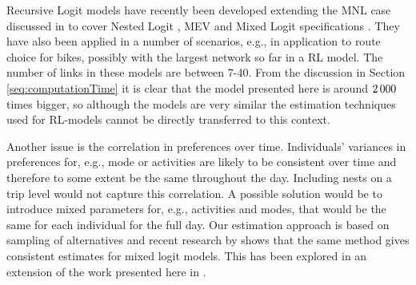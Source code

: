 Recursive Logit models have recently been developed extending the MNL case discussed in \citet{fosgerau2013} to cover Nested Logit \citep{mai2015}, MEV \citep{mai2016method} and Mixed Logit specifications \citep{mai2016decomposition}. They have also been applied in a number of scenarios, e.g., in \cite{zimmermann2017bike}  application to route choice for bikes, possibly with the largest network so far in a RL model. The number of links in these models are between 7-40. From the discussion in Section \ref{seq:computationTime} it is clear that the model presented here is around $2\, 000$ times bigger, so although the models are very similar the estimation techniques used for RL-models cannot be directly transferred to this context. 

 Another issue is the correlation in preferences over time. Individuals' variances in preferences for, e.g., mode or activities are likely to be consistent over time and therefore to some extent be the same throughout the day. Including nests on a trip level would not capture this correlation. A possible solution would be to introduce mixed parameters for, e.g., activities and modes, that would be the same for each individual for the full day. Our estimation approach is based on sampling of alternatives and recent research by \citet{guevara2013mixed} shows that the same method gives consistent estimates for mixed logit models. This has been explored in an extension of the work presented here in \citep{maelleMixed17}.
 
